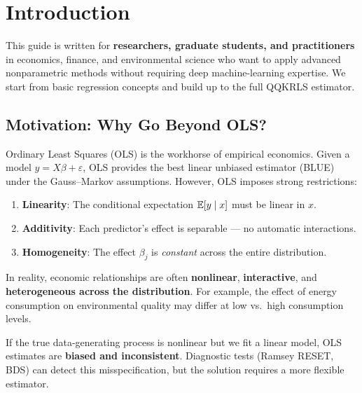 
\section{Introduction}

\begin{tipbox}
This guide is written for \textbf{researchers, graduate students, and practitioners} in economics, finance, and environmental science who want to apply advanced nonparametric methods without requiring deep machine-learning expertise. We start from basic regression concepts and build up to the full QQKRLS estimator.
\end{tipbox}

\subsection{Motivation: Why Go Beyond OLS?}

Ordinary Least Squares (OLS) is the workhorse of empirical economics. Given a model $y = X\beta + \varepsilon$, OLS provides the best linear unbiased estimator (BLUE) under the Gauss--Markov assumptions. However, OLS imposes strong restrictions:

\begin{enumerate}[label=\textcolor{primaryblue}{\arabic*.}]
\item \textbf{Linearity}: The conditional expectation $\mathbb{E}[y \mid x]$ must be linear in $x$.
\item \textbf{Additivity}: Each predictor's effect is separable --- no automatic interactions.
\item \textbf{Homogeneity}: The effect $\beta_j$ is \emph{constant} across the entire distribution.
\end{enumerate}

In reality, economic relationships are often \textbf{nonlinear}, \textbf{interactive}, and \textbf{heterogeneous across the distribution}. For example, the effect of energy consumption on environmental quality may differ at low vs.\ high consumption levels.

\begin{warningbox}
If the true data-generating process is nonlinear but we fit a linear model, OLS estimates are \textbf{biased and inconsistent}. Diagnostic tests (Ramsey RESET, BDS) can detect this misspecification, but the solution requires a more flexible estimator.
\end{warningbox}

